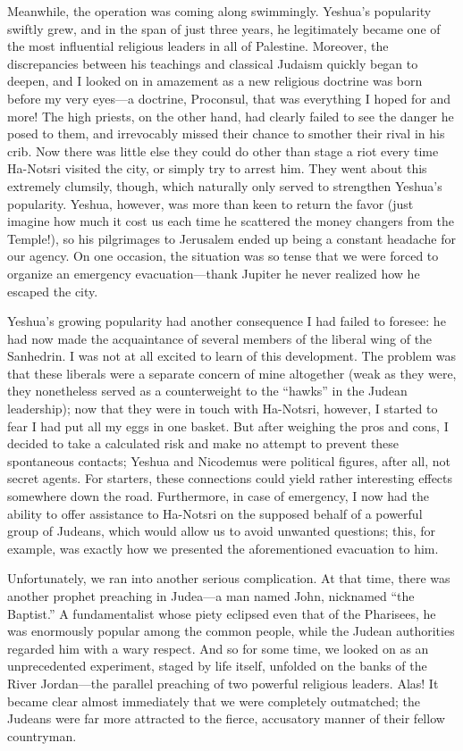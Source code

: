 Meanwhile, the operation was coming along swimmingly. Yeshua's popularity swiftly grew, and in the span of just three years, he legitimately became one of the most influential religious leaders in all of Palestine. Moreover, the discrepancies between his teachings and classical Judaism quickly began to deepen, and I looked on in amazement as a new religious doctrine was born before my very eyes---a doctrine, Proconsul, that was everything I hoped for and more! The high priests, on the other hand, had clearly failed to see the danger he posed to them, and irrevocably missed their chance to smother their rival in his crib. Now there was little else they could do other than stage a riot every time Ha-Notsri visited the city, or simply try to arrest him. They went about this extremely clumsily, though, which naturally only served to strengthen Yeshua's popularity. Yeshua, however, was more than keen to return the favor (just imagine how much it cost us each time he scattered the money changers from the Temple!), so his pilgrimages to Jerusalem ended up being a constant headache for our agency. On one occasion, the situation was so tense that we were forced to organize an emergency evacuation---thank Jupiter he never realized how he escaped the city.

Yeshua's growing popularity had another consequence I had failed to foresee: he had now made the acquaintance of several members of the liberal wing of the Sanhedrin. I was not at all excited to learn of this development. The problem was that these liberals were a separate concern of mine altogether (weak as they were, they nonetheless served as a counterweight to the ``hawks'' in the Judean leadership); now that they were in touch with Ha-Notsri, however, I started to fear I had put all my eggs in one basket. But after weighing the pros and cons, I decided to take a calculated risk and make no attempt to prevent these spontaneous contacts; Yeshua and Nicodemus were political figures, after all, not secret agents. For starters, these connections could yield rather interesting effects somewhere down the road. Furthermore, in case of emergency, I now had the ability to offer assistance to Ha-Notsri on the supposed behalf of a powerful group of Judeans, which would allow us to avoid unwanted questions; this, for example, was exactly how we presented the aforementioned evacuation to him.

Unfortunately, we ran into another serious complication. At that time, there was another prophet preaching in Judea---a man named John, nicknamed ``the Baptist.'' A fundamentalist whose piety eclipsed even that of the Pharisees, he was enormously popular among the common people, while the Judean authorities regarded him with a wary respect. And so for some time, we looked on as an unprecedented experiment, staged by life itself, unfolded on the banks of the River Jordan---the parallel preaching of two powerful religious leaders. Alas! It became clear almost immediately that we were completely outmatched; the Judeans were far more attracted to the fierce, accusatory manner of their fellow countryman.

